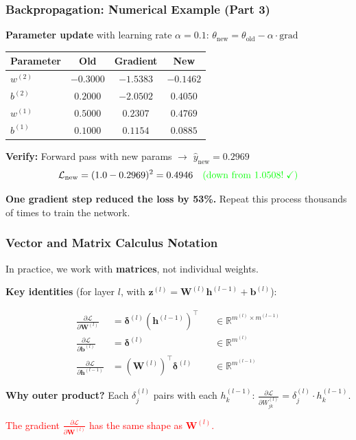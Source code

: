 \documentclass[notes,11pt, aspectratio=169]{beamer}
\newcommand{\vb}{\mathbf{b}}
\newcommand{\vh}{\mathbf{h}}
\newcommand{\vz}{\mathbf{z}}
\newcommand{\vW}{\mathbf{W}}
\newcommand{\R}{\mathbb{R}}
\newcommand{\pd}[2]{\frac{\partial #1}{\partial #2}}
\begin{document}
\begin{frame}
\frametitle{Backpropagation: Numerical Example (Part 3)}

\textbf{Parameter update} with learning rate $\alpha = 0.1$: \quad $\theta_{\text{new}} = \theta_{\text{old}} - \alpha \cdot \text{grad}$

\vspace{4pt}
\renewcommand{\arraystretch}{1.3}
\begin{center}
{\small
\begin{tabular}{lccc}
\toprule
\textbf{Parameter} & \textbf{Old} & \textbf{Gradient} & \textbf{New} \\
\midrule
$w^{(2)}$ & $-0.3000$ & $-1.5383$ & $-0.1462$ \\
$b^{(2)}$ & $0.2000$ & $-2.0502$ & $0.4050$ \\
$w^{(1)}$ & $0.5000$ & $0.2307$ & $0.4769$ \\
$b^{(1)}$ & $0.1000$ & $0.1154$ & $0.0885$ \\
\bottomrule
\end{tabular}
}
\end{center}

\vspace{4pt}
\textbf{Verify:} Forward pass with new params $\to$ $\hat{y}_{\text{new}} = 0.2969$
\[
    \mathcal{L}_{\text{new}} = (1.0 - 0.2969)^2 = 0.4946 \quad \textcolor{green}{\text{(down from 1.0508!} \; \checkmark\text{)}}
\]

\textbf{One gradient step reduced the loss by 53\%.} Repeat this process thousands of times to train the network.
\end{frame}

\begin{frame}
\frametitle{Vector and Matrix Calculus Notation}

In practice, we work with \textbf{matrices}, not individual weights.

\vspace{4pt}
\textbf{Key identities} (for layer $l$, with $\vz^{(l)} = \vW^{(l)}\vh^{(l-1)} + \vb^{(l)}$):

\begin{align*}
    \pd{\mathcal{L}}{\vW^{(l)}} &= \bm{\delta}^{(l)} (\vh^{(l-1)})^\top && \in \R^{m^{(l)} \times m^{(l-1)}} \\[2pt]
    \pd{\mathcal{L}}{\vb^{(l)}} &= \bm{\delta}^{(l)} && \in \R^{m^{(l)}} \\[2pt]
    \pd{\mathcal{L}}{\vh^{(l-1)}} &= (\vW^{(l)})^\top \bm{\delta}^{(l)} && \in \R^{m^{(l-1)}}
\end{align*}

\textbf{Why outer product?} Each $\delta_j^{(l)}$ pairs with each $h_k^{(l-1)}$: \quad $\pd{\mathcal{L}}{W_{jk}^{(l)}} = \delta_j^{(l)} \cdot h_k^{(l-1)}$.

\vspace{4pt}
\textcolor{red}{The gradient $\pd{\mathcal{L}}{\vW^{(l)}}$ has the same shape as $\vW^{(l)}$.}
\end{frame}
\end{document}
